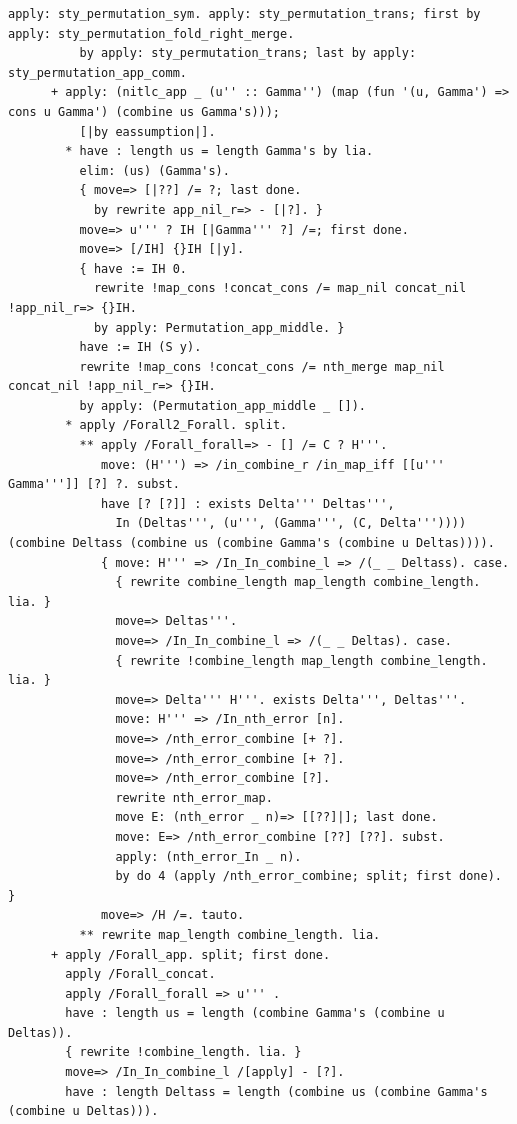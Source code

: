 \documentclass[10pt,a4paper]{article}
\begin{document}
\begin{lstlisting}[style=authorcoq]
          apply: sty_permutation_sym. apply: sty_permutation_trans; first by apply: sty_permutation_fold_right_merge.
          by apply: sty_permutation_trans; last by apply: sty_permutation_app_comm.
      + apply: (nitlc_app _ (u'' :: Gamma'') (map (fun '(u, Gamma') => cons u Gamma') (combine us Gamma's)));
          [|by eassumption|].
        * have : length us = length Gamma's by lia.
          elim: (us) (Gamma's).
          { move=> [|??] /= ?; last done.
            by rewrite app_nil_r=> - [|?]. }
          move=> u''' ? IH [|Gamma''' ?] /=; first done.
          move=> [/IH] {}IH [|y].
          { have := IH 0.
            rewrite !map_cons !concat_cons /= map_nil concat_nil !app_nil_r=> {}IH.
            by apply: Permutation_app_middle. }
          have := IH (S y).
          rewrite !map_cons !concat_cons /= nth_merge map_nil concat_nil !app_nil_r=> {}IH.
          by apply: (Permutation_app_middle _ []).
        * apply /Forall2_Forall. split.
          ** apply /Forall_forall=> - [] /= C ? H'''.
             move: (H''') => /in_combine_r /in_map_iff [[u''' Gamma''']] [?] ?. subst.
             have [? [?]] : exists Delta''' Deltas''', 
               In (Deltas''', (u''', (Gamma''', (C, Delta''')))) (combine Deltass (combine us (combine Gamma's (combine u Deltas)))).
             { move: H''' => /In_In_combine_l => /(_ _ Deltass). case.
               { rewrite combine_length map_length combine_length. lia. }
               move=> Deltas'''.
               move=> /In_In_combine_l => /(_ _ Deltas). case.
               { rewrite !combine_length map_length combine_length. lia. }
               move=> Delta''' H'''. exists Delta''', Deltas'''.
               move: H''' => /In_nth_error [n].
               move=> /nth_error_combine [+ ?].
               move=> /nth_error_combine [+ ?].
               move=> /nth_error_combine [?].
               rewrite nth_error_map.
               move E: (nth_error _ n)=> [[??]|]; last done.
               move: E=> /nth_error_combine [??] [??]. subst.
               apply: (nth_error_In _ n).
               by do 4 (apply /nth_error_combine; split; first done). }
             move=> /H /=. tauto.
          ** rewrite map_length combine_length. lia.
      + apply /Forall_app. split; first done.
        apply /Forall_concat.
        apply /Forall_forall => u''' .
        have : length us = length (combine Gamma's (combine u Deltas)).
        { rewrite !combine_length. lia. }
        move=> /In_In_combine_l /[apply] - [?].
        have : length Deltass = length (combine us (combine Gamma's (combine u Deltas))).

\end{lstlisting}
\end{document}
